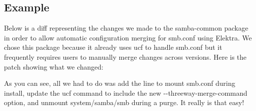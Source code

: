 \subsection*{Example}

Below is a diff representing the changes we made to the samba-\/common package in order to allow automatic configuration merging for {\ttfamily smb.\+conf} using Elektra. We chose this package because it already uses ucf to handle {\ttfamily smb.\+conf} but it frequently requires users to manually merge changes across versions. Here is the patch showing what we changed\+:




As you can see, all we had to do was add the line to mount {\ttfamily smb.\+conf} during install, update the ucf command to include the new {\ttfamily -\/-\/threeway-\/merge-\/command} option, and unmount {\ttfamily system/samba/smb} during a purge. It really is that easy! 